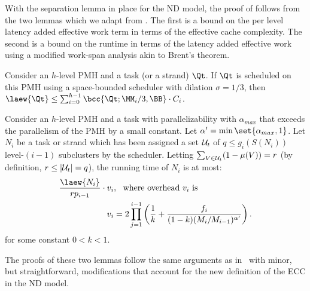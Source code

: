 With the separation lemma in place for the ND model, the proof of
 follows from the two lemmas which we adapt from
\cite{BlellochFiGi11}. The first is a bound on the per level latency
added effective work term in terms of the effective cache complexity.
The second is a bound on the runtime in terms of the latency added
effective work using a modified work-span analysis akin to
 Brent's theorem.

\begin{lemma}
  Consider an $h$-level PMH and a task (or a strand) $\Qt$. 
  If $\Qt$ is scheduled on this PMH using a space-bounded
  scheduler with dilation $\sigma = 1/3$, then
$\laew{\Qt} \leq \sum_{i=0}^{h-1} \bcc{\Qt; \MM_i/3, \BB}\cdot C_i$.
  \label{lemma:leveldecompapp}
\end{lemma}
\begin{lemma}
  Consider an $h$-level PMH and a task with parallelizability with
  $\alpha_{max}$ that exceeds the parallelism of the PMH by a small
  constant. Let $\alpha' = \min\set{\alpha_{max},1}$.
  Let $N_i$ be a task or strand which has been
  assigned a set ${\cal U}_t$ of $q \leq g_i(S(N_i))$
  level-$(i-1)$ subclusters by the scheduler. Letting $\sum_{V\in{\cal
  U}_t} (1-\mu(V)) = r$ (by definition, $r\leq \lvert{\cal U}_t\rvert
  = q$), the running time of $N_i$ is at most:
\begin{align*}
\frac{\laew{N_i}}{rp_{i-1}}\cdot v_i &,
\ \ \textrm{where overhead}\ v_i\ \textrm{is}\ \\ 
v_i&=2\prod_{j=1}^{i-1} \left(\frac{1}{k} +
  \frac{f_i}{(1-k)(M_i/M_{i-1})^{\alpha'}}\right).
\end{align*}
for some constant $0<k<1$.
  \label{lem:runtime}
\end{lemma}
The proofs of these two lemmas follow the same arguments as
in~\cite{BlellochFiGi11} with minor, but straightforward, modifications
that account for the new definition of the ECC in the ND model.

